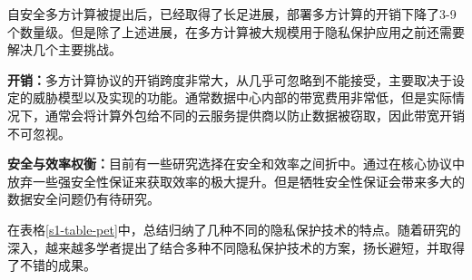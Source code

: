 自安全多方计算被提出后，已经取得了长足进展，部署多方计算的开销下降了3-9个数量级。但是除了上述进展，在多方计算被大规模用于隐私保护应用之前还需要解决几个主要挑战。
\begin{compactitem}
	\item \textbf{开销：}多方计算协议的开销跨度非常大，从几乎可忽略到不能接受，主要取决于设定的威胁模型以及实现的功能。通常数据中心内部的带宽费用非常低，但是实际情况下，通常会将计算外包给不同的云服务提供商以防止数据被窃取，因此带宽开销不可忽视。
	\item \textbf{安全与效率权衡：}目前有一些研究选择在安全和效率之间折中。通过在核心协议中放弃一些强安全性保证来获取效率的极大提升。但是牺牲安全性保证会带来多大的数据安全问题仍有待研究。
\end{compactitem}

在表格\ref{s1-table-pet}中，总结归纳了几种不同的隐私保护技术的特点。随着研究的深入，越来越多学者提出了结合多种不同隐私保护技术的方案，扬长避短，并取得了不错的成果\cite{2015ABY,jagannathan2005privacy,su2007privacy,bozdemir2021privacy}。

\begin{table}[htbp]
	\centering
	\renewcommand{\arraystretch}{1.3}
	\caption{隐私保护技术对比}
	\label{s1-table-pet}
\end{table}

